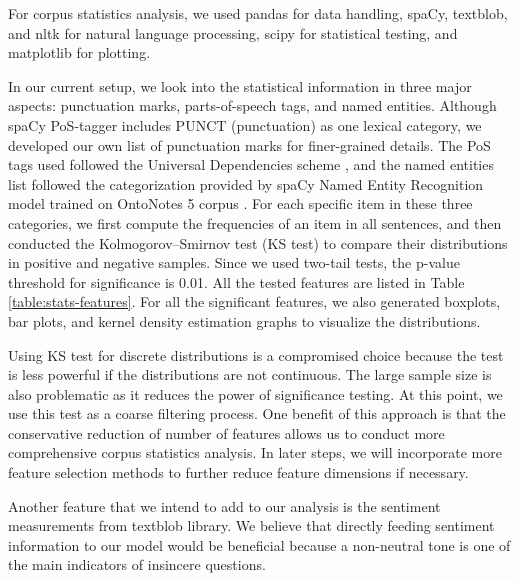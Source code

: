 \documentclass[12pt]{diazessay} %
\begin{document}
For corpus statistics analysis, we used pandas for data handling, spaCy, textblob, and nltk for natural language processing, scipy for statistical testing, and matplotlib for plotting. 

In our current setup, we look into the statistical information in three major aspects: punctuation marks, parts-of-speech tags, and named entities. Although spaCy PoS-tagger includes PUNCT (punctuation) as one lexical category, we developed our own list of punctuation marks for finer-grained details. The PoS tags used followed the Universal Dependencies scheme \citep{pos-tag}, and the named entities list followed the categorization provided by spaCy Named Entity Recognition model trained on OntoNotes 5 corpus \citep{spacy-named-entity}. For each specific item in these three categories, we first compute the frequencies of an item in all sentences, and then conducted the Kolmogorov–Smirnov test (KS test) to compare their distributions in positive and negative samples. Since we used two-tail tests, the p-value threshold for significance is 0.01. All the tested features are listed in Table \ref{table:stats-features}. For all the significant features, we also generated boxplots, bar plots, and kernel density estimation graphs to visualize the distributions. 

Using KS test for discrete distributions is a compromised choice because the test is less powerful if the distributions are not continuous. The large sample size is also problematic as it reduces the power of significance testing. At this point, we use this test as a coarse filtering process. One benefit of this approach is that the conservative reduction of number of features allows us to conduct more comprehensive corpus statistics analysis. In later steps, we will incorporate more feature selection methods to further reduce feature dimensions if necessary. 

Another feature that we intend to add to our analysis is the sentiment measurements from textblob library. We believe that directly feeding sentiment information to our model would be beneficial because a non-neutral tone is one of the main indicators of insincere questions. 
\end{document}

